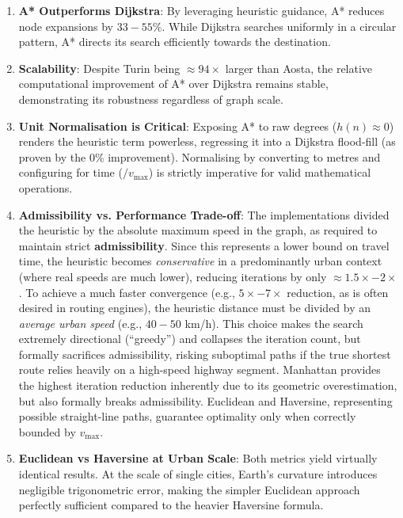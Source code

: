 \documentclass[12pt,a4paper]{article}
\begin{document}
\begin{enumerate}
  \item \textbf{A* Outperforms Dijkstra}: By leveraging heuristic guidance, A* reduces node expansions by $33 - 55\%$. While Dijkstra searches uniformly in a circular pattern, A* directs its search efficiently towards the destination.
  
  \item \textbf{Scalability}: Despite Turin being $\approx 94\times$ larger than Aosta, the relative computational improvement of A* over Dijkstra remains stable, demonstrating its robustness regardless of graph scale.

  \item \textbf{Unit Normalisation is Critical}: Exposing A* to raw degrees ($h(n) \approx 0$) renders the heuristic term powerless, regressing it into a Dijkstra flood-fill (as proven by the 0\% improvement). Normalising by converting to metres and configuring for time ($ / v_{\max}$) is strictly imperative for valid mathematical operations.

  \item \textbf{Admissibility vs. Performance Trade-off}: The implementations divided the heuristic by the absolute maximum speed in the graph, as required to maintain strict \textbf{admissibility}. Since this represents a lower bound on travel time, the heuristic becomes \textit{conservative} in a predominantly urban context (where real speeds are much lower), reducing iterations by only $\approx 1.5\times - 2\times$. To achieve a much faster convergence (e.g., $5\times - 7\times$ reduction, as is often desired in routing engines), the heuristic distance must be divided by an \textit{average urban speed} (e.g., $40 - 50$ km/h). This choice makes the search extremely directional (``greedy'') and collapses the iteration count, but formally sacrifices admissibility, risking suboptimal paths if the true shortest route relies heavily on a high-speed highway segment. Manhattan provides the highest iteration reduction inherently due to its geometric overestimation, but also formally breaks admissibility. Euclidean and Haversine, representing possible straight-line paths, guarantee optimality only when correctly bounded by $v_{\max}$.

  \item \textbf{Euclidean vs Haversine at Urban Scale}: Both metrics yield virtually identical results. At the scale of single cities, Earth's curvature introduces negligible trigonometric error, making the simpler Euclidean approach perfectly sufficient compared to the heavier Haversine formula.
\end{enumerate}
\end{document}
